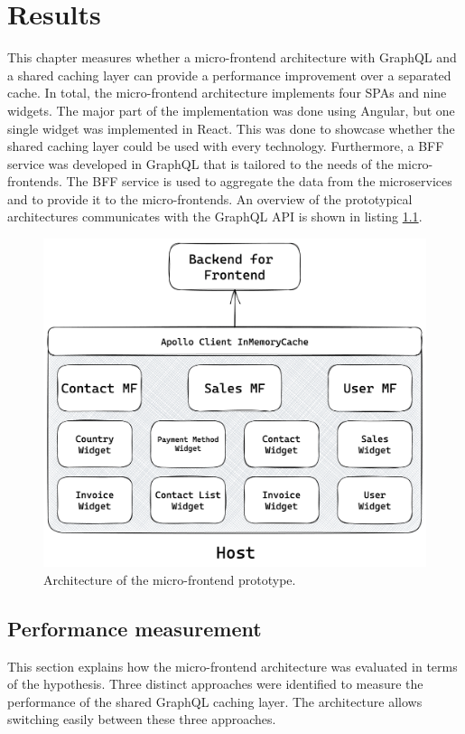 \chapter{Results}\label{chapter:results}

This chapter measures whether a micro-frontend architecture with GraphQL and a shared caching layer can provide a performance improvement over a separated cache. In total, the micro-frontend architecture implements four \acp{SPA} and nine widgets. The major part of the implementation was done using Angular, but one single widget was implemented in React. This was done to showcase whether the shared caching layer could be used with every technology. Furthermore, a \ac{BFF} service was developed in GraphQL that is tailored to the needs of the micro-frontends. The \ac{BFF} service is used to aggregate the data from the microservices and to provide it to the micro-frontends. An overview of the prototypical architectures communicates with the GraphQL \ac{API} is shown in listing \ref{fig:results:micro-frontend-prototype}.

\ifshowImages
\begin{figure}[H]
  \centering
  \includegraphics[width=0.8\linewidth]{images/results/micro-frontend-prototype.png}
  \caption{Architecture of the micro-frontend prototype.}\label{fig:results:micro-frontend-prototype}
\end{figure}
\fi

\section{Performance measurement}

This section explains how the micro-frontend architecture was evaluated in terms of the hypothesis. Three distinct approaches were identified to measure the performance of the shared GraphQL caching layer. The architecture allows switching easily between these three approaches.

